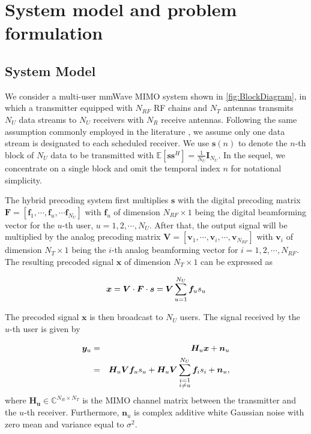 \documentclass[conference]{IEEEtran}
\begin{document}
\section{System model and problem formulation}

\subsection{System Model}

We consider a multi-user mmWave MIMO system shown in \figurename{ \ref{fig:BlockDiagram}}, in which a transmitter equipped with $N_{RF}$ RF chains and $N_T$ antennas transmits $N_U$ data streams to $N_U$ receivers with $N_R$ receive antennas. Following the same assumption commonly employed in the literature \cite{alkhateeb2015limited}, we assume only one data stream is designated to each scheduled receiver. We use ${\bm s}(n)$ to denote the $n$-th block of $N_U$ data to be transmitted with $\mathbb{E}\left[\bm{ss}^H\right]=\frac{1}{N_U}\bm{I}_{N_U}$. In the sequel, we concentrate on a single block and omit the temporal index $n$ for notational simplicity.


The hybrid precoding system first multiplies ${\bm s}$ with the digital precoding matrix $\bm{F}=\left[{\bm f}_1,\cdots,{\bm f}_u,\cdots{\bm f}_{N_U}\right]$ with ${\bm f}_u$ of dimension $N_{RF}\times 1$ being the digital beamforming vector for the $u$-th user, $u=1,2,\cdots,N_U$. After that, the output signal will be multiplied by the analog precoding matrix $\bm{V}=\left[{\bm v}_1,\cdots,{\bm v}_i,\cdots,{\bm v}_{N_{RF}}\right]$ with ${\bm v}_i$ of dimension $N_T\times 1$ being the $i$-th analog beamforming vector for $i=1,2,\cdots,N_{RF}$. The resulting precoded signal $\bm x$ of dimension $N_T\times 1$  can be expressed as

\begin{equation}{\label{eq:transx1}}
{\bm x} = \bm{V}\cdot \bm{F}\cdot\bm{s}= \bm{V}\sum_{u=1}^{N_U}\bm{f}_us_u
\end{equation}

The precoded signal $\bm x$ is then broadcast to $N_U$ users. The signal received by the $u$-th user is given by

\begin{eqnarray}{\label{eq:transx2}}
{\bm y}_u &=& \bm{H}_u \bm{x} + \bm{n}_u\\
&=&\bm{H}_u \bm{V}\bm{f}_us_u+\bm{H}_u \bm{V}\sum_{\substack{i=1 \\ i\neq u}}^{N_U}\bm{f}_is_i+\bm{n}_u,
\end{eqnarray}
where $\bm{H_u}$$\in\mathbb{C}^{N_R\times N_T}$ is the MIMO channel matrix between the transmitter and the $u$-th receiver\cite{el2014spatially}. Furthermore, $\bm{n}_u$ is complex additive white Gaussian noise with zero mean and variance equal to $\sigma^2$.
\end{document}
